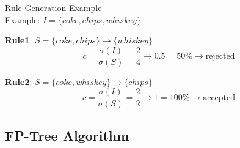 \begin{example2}{Rule Generation Example}\\
Example: $I = \{coke, chips, whiskey\}$

\textbf{Rule1}: $S = \{coke, chips\} \rightarrow \{whiskey\}$
$$c = \frac{\sigma(I)}{\sigma(S)} = \frac{2}{4} \rightarrow 0.5 = 50\% \rightarrow \text{rejected}$$

\textbf{Rule2}: $S = \{coke, whiskey\} \rightarrow \{chips\}$
$$c = \frac{\sigma(I)}{\sigma(S)} = \frac{2}{2} \rightarrow 1 = 100\% \rightarrow \text{accepted}$$
\end{example2}


\subsection{FP-Tree Algorithm}

